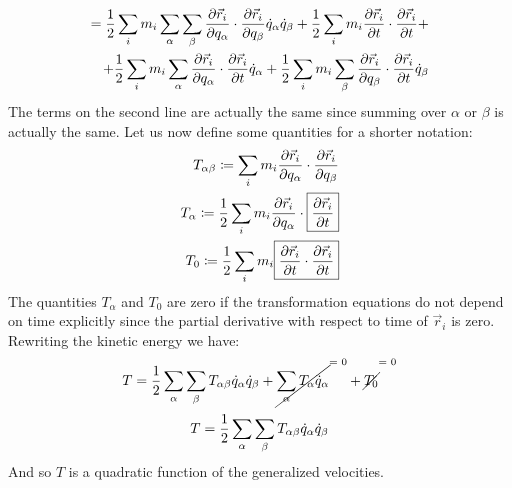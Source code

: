 \begin{equation}
    \begin{split}
        = \dfrac{1}{2}\displaystyle\sum_i m_i \displaystyle\sum_{\alpha}\displaystyle\sum_{\beta}\dfrac{\partial \vec{r}_i}{\partial q_{\alpha}}\cdot\dfrac{\partial \vec{r}_i}{\partial q_{\beta}}\dot{q}_{\alpha}\dot{q}_{\beta} + \dfrac{1}{2}\displaystyle\sum_i m_i \dfrac{\partial \vec{r}_i}{\partial t} \cdot \dfrac{\partial \vec{r}_i}{\partial t} +\\
        + \dfrac{1}{2}\displaystyle\sum_i m_i \displaystyle\sum_{\alpha}\dfrac{\partial \vec{r}_i}{\partial q_{\alpha}} \cdot \dfrac{\partial \vec{r}_i}{\partial t} \dot{q}_{\alpha} + \dfrac{1}{2}\displaystyle\sum_i m_i \displaystyle\sum_{\beta}\dfrac{\partial \vec{r}_i}{\partial q_{\beta}} \cdot \dfrac{\partial \vec{r}_i}{\partial t}\dot{q}_{\beta}
    \end{split}
\end{equation}
The terms on the second line are actually the same since summing over $\alpha$ or $\beta$ is actually the same. Let us now define some quantities for a shorter notation:
\begin{equation}
    \begin{split}
        T_{\alpha \beta} \coloneqq \displaystyle\sum_i m_i \dfrac{\partial \vec{r}_i}{\partial q_{\alpha}}\cdot\dfrac{\partial \vec{r}_i}{\partial q_{\beta}}\\
        T_{\alpha} \coloneqq \dfrac{1}{2} \displaystyle\sum_i m_i \dfrac{\partial \vec{r}_i}{\partial q_{\alpha}} \cdot \boxed{\dfrac{\partial \vec{r}_i}{\partial t}}\\
        T_0 \coloneqq \dfrac{1}{2}\displaystyle\sum_i m_i \boxed{\dfrac{\partial \vec{r}_i}{\partial t} \cdot \dfrac{\partial \vec{r}_i}{\partial t}}
    \end{split}
\end{equation}
The quantities $T_{\alpha}$ and $T_0$ are zero if the transformation equations do not depend on time explicitly since the partial derivative with respect to time of $\vec{r}_i$ is zero. Rewriting the kinetic energy we have:
\begin{equation}
    T = \dfrac{1}{2}\bigsum_{\alpha}\bigsum_{\beta}T_{\alpha \beta}\dot{q}_{\alpha}\dot{q}_{\beta} + \crossout{\bigsum_{\alpha}T_{\alpha}\dot{q}_{\alpha}} + \crossout{T_0}
\end{equation}
\begin{equation} \label{e:kinetic_energy}
    T = \dfrac{1}{2}\displaystyle\sum_{\alpha}\displaystyle\sum_{\beta}T_{\alpha \beta}\dot{q}_{\alpha}\dot{q}_{\beta}
\end{equation}
And so $T$ is a quadratic function of the generalized velocities.\\
